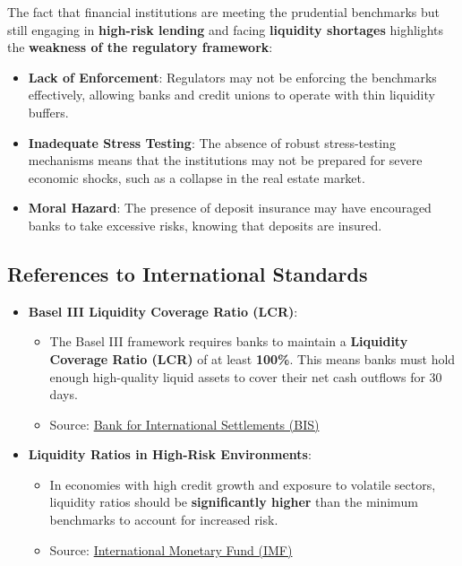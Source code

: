 The fact that financial institutions are meeting the prudential benchmarks but still engaging in \textbf{high-risk lending} and facing \textbf{liquidity shortages} highlights the \textbf{weakness of the regulatory framework}:
\begin{itemize}
    \item \textbf{Lack of Enforcement}: Regulators may not be enforcing the benchmarks effectively, allowing banks and credit unions to operate with thin liquidity buffers.
    \item \textbf{Inadequate Stress Testing}: The absence of robust stress-testing mechanisms means that the institutions may not be prepared for severe economic shocks, such as a collapse in the real estate market.
    \item \textbf{Moral Hazard}: The presence of deposit insurance may have encouraged banks to take excessive risks, knowing that deposits are insured.
\end{itemize}

\subsection*{References to International Standards}

\begin{itemize}
    \item \textbf{Basel III Liquidity Coverage Ratio (LCR)}:
        \begin{itemize}
            \item The Basel III framework requires banks to maintain a \textbf{Liquidity Coverage Ratio (LCR)} of at least \textbf{100\%}. This means banks must hold enough high-quality liquid assets to cover their net cash outflows for 30 days.
            \item Source: \href{https://www.bis.org/bcbs/basel3.htm}{Bank for International Settlements (BIS)}
        \end{itemize}
    \item \textbf{Liquidity Ratios in High-Risk Environments}:
        \begin{itemize}
            \item In economies with high credit growth and exposure to volatile sectors, liquidity ratios should be \textbf{significantly higher} than the minimum benchmarks to account for increased risk.
            \item Source: \href{https://www.imf.org/en/Publications/WP/Issues/2016/12/31/Liquidity-Risk-and-Credit-in-the-Transmission-of-Monetary-Policy-24322}{International Monetary Fund (IMF)}
        \end{itemize}
\end{itemize}

